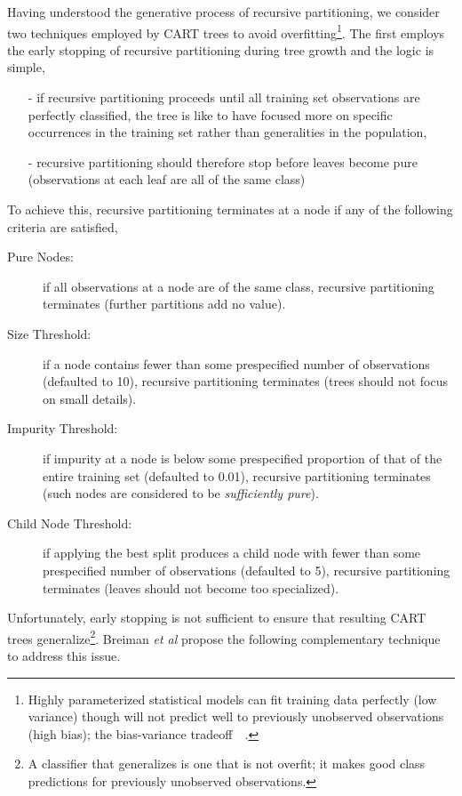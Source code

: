 Having understood the generative process of recursive partitioning, we consider two techniques employed by CART trees to avoid overfitting\footnote{Highly parameterized statistical models can fit training data perfectly (low variance) though will not predict well to previously unobserved observations (high bias); the bias-variance tradeoff~\cite{Geu02}~\cite{citeulike:161814}.}. The first employs the early stopping of recursive partitioning during tree growth and the logic is simple, 
\begin{itemize}
\item[-] if recursive partitioning proceeds until all training set observations are perfectly classified, the tree is like to have focused more on specific occurrences in the training set rather than generalities in the population,
\item[-] recursive partitioning should therefore stop before leaves become pure (observations at each leaf are all of the same class)
\end{itemize}
To achieve this, recursive partitioning terminates at a node if any of the following criteria are satisfied,
\begin{description}
\item[Pure Nodes:] if all observations at a node are of the same class, recursive partitioning terminates (further partitions add no value).
\item[Size Threshold:] if a node contains fewer than some prespecified number of observations (defaulted to 10), recursive partitioning terminates (trees should not focus on small details). 
\item[Impurity Threshold:] if impurity at a node is below some prespecified proportion of that of the entire training set (defaulted to 0.01), recursive partitioning terminates (such nodes are considered to be \emph{sufficiently pure}).
\item[Child Node Threshold:] if applying the best split produces a child node with fewer than some prespecified number of observations (defaulted to 5), recursive partitioning terminates (leaves should not become too specialized).
\end{description}
Unfortunately, early stopping is not sufficient to ensure that resulting CART trees generalize\footnote{A classifier that generalizes is one that is not overfit; it makes good class predictions for previously unobserved observations.}. Breiman \emph{et al} propose the following complementary technique to address this issue.

